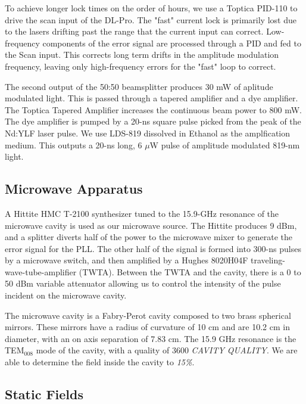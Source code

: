 \documentclass[aps,pra,preprint,groupedaddress]{revtex4-1}
\begin{document}
To achieve longer lock times on the order of hours, we use a Toptica PID-110 to drive the scan input of the DL-Pro. The "fast" current lock is primarily lost due to the lasers drifting past the range that the current input can correct. Low-frequency components of the error signal are processed through a PID and fed to the Scan input. This corrects long term drifts in the amplitude modulation frequency, leaving only high-frequency errors for the "fast" loop to correct.

The second output of the 50:50 beamsplitter produces 30 mW of aplitude modulated light. This is passed through a tapered amplifier and a dye amplifier. The Toptica Tapered Amplifier increases the continuous beam power to 800 mW. The dye amplifier is pumped by a 20-ns square pulse picked from the peak of the Nd:YLF laser pulse. We use LDS-819 dissolved in Ethanol as the amplfication medium. This outputs a 20-ns long, 6 $\mu$W pulse of amplitude modulated 819-nm light.

\subsection{\label{cavity} Microwave Apparatus}

A Hittite HMC T-2100 synthesizer tuned to the 15.9-GHz resonance of the microwave cavity is used as our microwave source. The Hittite produces 9 dBm, and a splitter diverts half of the power to the microwave mixer to generate the error signal for the PLL. The other half of the signal is formed into 300-ns pulses by a microwave switch, and then amplified by a Hughes 8020H04F traveling-wave-tube-amplifier (TWTA). Between the TWTA and the cavity, there is a 0 to 50 dBm variable attenuator allowing us to control the intensity of the pulse incident on the microwave cavity.

The microwave cavity is a Fabry-Perot cavity composed to two brass spherical mirrors. These mirrors have a radius of curvature of 10 cm and are 10.2 cm in diameter, with an on axis separation of 7.83 cm. The 15.9 GHz resonance is the TEM$_{008}$ mode of the cavity, with a quality of 3600 \emph{CAVITY QUALITY}. We are able to determine the field inside the cavity to \emph{15\%}.

\subsection{\label{fields} Static Fields}
\end{document}
